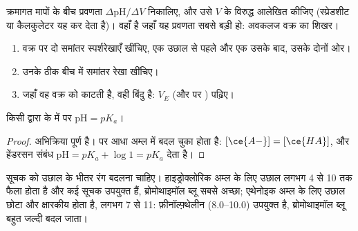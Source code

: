 \begin{method}[अवकलज विधि]\label{met:g12:ph-conductivity-titrations:derivative}
क्रमागत मापों के बीच प्रवणता
$\Delta\mathrm{pH}/\Delta V$ निकालिए, और उसे $V$ के विरुद्ध आलेखित कीजिए (स्प्रेडशीट या
कैलकुलेटर यह कर देता है)।  वहाँ है जहाँ यह प्रवणता
सबसे बड़ी हो: अवकलज वक्र का शिखर।
\end{method}

\begin{method}[स्पर्शरेखा विधि]\label{met:g12:ph-conductivity-titrations:tangent}
\begin{enumerate}
  \item वक्र पर दो समांतर स्पर्शरेखाएँ खींचिए, एक उछाल से पहले और एक उसके
        बाद, उसके दोनों ओर।
  \item उनके ठीक बीच में समांतर रेखा खींचिए।
  \item जहाँ वह वक्र को काटती है, वही  बिंदु है: $V_E$ (और
         पर ) पढ़िए।
\end{enumerate}
\end{method}

\begin{proposition}[अर्ध-तुल्यता पर $\mathrm{pH} = pK_a$]\label{prop:g12:ph-conductivity-titrations:half}
किसी  द्वारा   के  में
 पर $\mathrm{pH} = pK_a$।
\end{proposition}

\begin{proof}
अभिक्रिया  पूर्ण है।  पर
आधा अम्ल  में बदल चुका होता है: $[\ce{A-}] = [\ce{HA}]$, और
हेंडरसन संबंध $\mathrm{pH} = pK_a + \log 1 = pK_a$ देता है।
\end{proof}

\begin{remark}[वक्र से सूचक चुनना]\label{rem:g12:ph-conductivity-titrations:indicator}
सूचक को उछाल के भीतर रंग बदलना चाहिए। हाइड्रोक्लोरिक अम्ल के लिए
उछाल लगभग  4 से 10 तक फैला होता है और कई सूचक उपयुक्त हैं, ब्रोमोथाइमॉल ब्लू
सबसे अच्छा; एथेनोइक अम्ल के लिए उछाल छोटा और क्षारकीय होता है, लगभग 7 से 11:
फ़ीनॉल्फ़्थेलीन (8.0--10.0) उपयुक्त है, ब्रोमोथाइमॉल ब्लू बहुत
जल्दी बदल जाता।
\end{remark}

